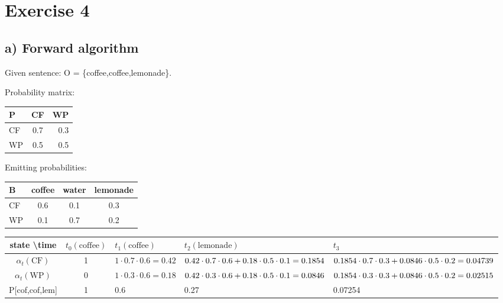 \documentclass[a4paper]{article}
\begin{document}
\section*{Exercise 4}
\subsection*{a) Forward algorithm}
Given sentence: O = \{coffee,coffee,lemonade\}. 

\vspace{5mm}
\noindent Probability matrix:

\begin{tabular}{ l | c | r }
  P & CF & WP \\ \hline
  CF & 0.7 & 0.3 \\
  WP & 0.5 & 0.5 \\
\end{tabular}

\vspace{5mm}
\noindent Emitting probabilities:

\begin{tabular}{ l | c | c | c }
  B & coffee & water & lemonade \\ \hline
  CF & 0.6 & 0.1 & 0.3 \\
  WP & 0.1 & 0.7 & 0.2 \\
\end{tabular}

\vspace{5mm}
\begin{tabular}{| c | c | p{3cm} | p{3cm} | p{3cm}|}
  \hline
  state \textbackslash time & $t_0(\text{coffee})$ & $t_1(\text{coffee})$ & $t_2(\text{lemonade})$ & $t_3$\\ \hline
  $\alpha_t(\text{CF})$ 	& 1 & $1 \cdot 0.7 \cdot 0.6 = 0.42$ 	& $0.42 \cdot 0.7 \cdot 0.6 \newline + 0.18 \cdot 0.5 \cdot 0.1 \newline = 0.1854$ & $0.1854 \cdot 0.7 \cdot 0.3 \newline + 0.0846 \cdot 0.5 \cdot 0.2 \newline = 0.04739$\\ \hline
  $\alpha_t(\text{WP})$ 	& 0 & $1 \cdot 0.3 \cdot 0.6 = 0.18$	& $0.42 \cdot 0.3 \cdot 0.6 \newline + 0.18 \cdot 0.5 \cdot 0.1 \newline = 0.0846$ & $0.1854 \cdot 0.3 \cdot 0.3 + 0.0846 \cdot 0.5 \cdot 0.2 \newline = 0.02515$ \\ \hline
  P[cof,cof,lem] & 1 & 0.6	& 0.27 & 0.07254 \\ \hline
\end{tabular}
\end{document}
